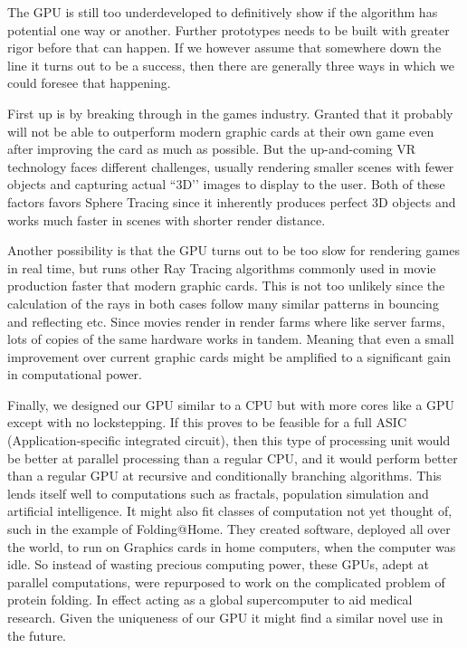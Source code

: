 		The GPU is still too underdeveloped to definitively show if the
		algorithm has potential one way or another.  Further prototypes needs
		to be built with greater rigor before that can happen. If we however
		assume that somewhere down the line it turns out to be a success,
		then there are generally three ways in which we could foresee that
		happening.
		
		First up is by breaking through in the games industry. Granted that
		it probably will not be able to outperform modern graphic cards at
		their own game even after improving the card as much as possible. But
		the up-and-coming VR technology faces different challenges, usually
		rendering smaller scenes with fewer objects and capturing actual
		``3D’’ images to display to the user. Both of these factors favors
		Sphere Tracing since it inherently produces perfect 3D objects and
		works much faster in scenes with shorter render distance.
		
		Another possibility is that the GPU turns out to be too slow for
		rendering games in real time, but runs other Ray Tracing algorithms
		commonly used in movie production faster that modern graphic cards.
		This is not too unlikely since the calculation of the rays in both
		cases follow many similar patterns in bouncing and reflecting etc.
		Since movies render in render farms where like server farms, lots of
		copies of the same hardware works in tandem. Meaning that even a
		small improvement over current graphic cards might be amplified to a
		significant gain in computational power.
		
		Finally, we designed our GPU similar to a CPU but with more	cores
		like a GPU except with no lockstepping. If this proves to be feasible
		for a full ASIC (Application-specific integrated circuit), then this
		type of processing unit would be better at parallel processing than a
		regular CPU, and it would perform better than a regular GPU at
		recursive and conditionally branching algorithms. This lends itself
		well to computations such as fractals, population simulation and
		artificial intelligence. It might also fit classes of computation not
		yet thought of, such in the example of Folding@Home\cite{Beberg2009}.
		They created software, deployed all over the world, to run on
		Graphics cards in home computers, when the computer was idle. So
		instead of wasting precious computing power, these GPUs, adept at
		parallel computations, were repurposed to work on the complicated
		problem of protein folding. In effect acting as a global
		supercomputer to aid medical research. Given the uniqueness of our
		GPU it might find a similar novel use in the future.
